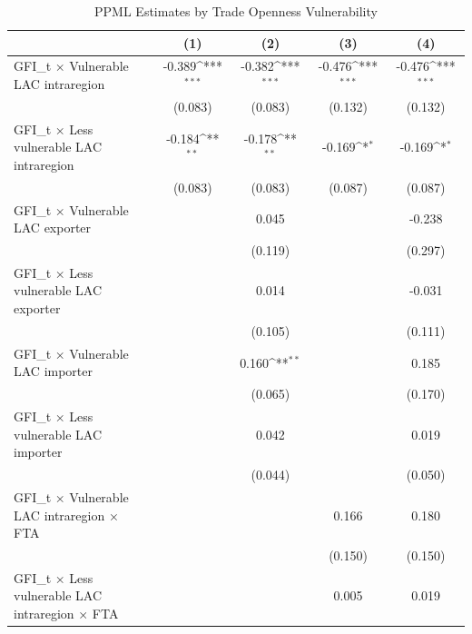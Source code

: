 \begin{table}[htbp]\centering
\def\sym#1{\ifmmode^{#1}\else\(^{#1}\)\fi}
\caption{PPML Estimates by Trade Openness Vulnerability}
\begin{tabular}{l*{4}{c}}
\hline\hline
          &\multicolumn{1}{c}{(1)}         &\multicolumn{1}{c}{(2)}         &\multicolumn{1}{c}{(3)}         &\multicolumn{1}{c}{(4)}         \\
\hline
GFI\_t × Vulnerable LAC intraregion&   -0.389\sym{***}&   -0.382\sym{***}&   -0.476\sym{***}&   -0.476\sym{***}\\
          &  (0.083)         &  (0.083)         &  (0.132)         &  (0.132)         \\
[1em]
GFI\_t × Less vulnerable LAC intraregion&   -0.184\sym{**} &   -0.178\sym{**} &   -0.169\sym{*}  &   -0.169\sym{*}  \\
          &  (0.083)         &  (0.083)         &  (0.087)         &  (0.087)         \\
[1em]
GFI\_t × Vulnerable LAC exporter&                  &    0.045         &                  &   -0.238         \\
          &                  &  (0.119)         &                  &  (0.297)         \\
[1em]
GFI\_t × Less vulnerable LAC exporter&                  &    0.014         &                  &   -0.031         \\
          &                  &  (0.105)         &                  &  (0.111)         \\
[1em]
GFI\_t × Vulnerable LAC importer&                  &    0.160\sym{**} &                  &    0.185         \\
          &                  &  (0.065)         &                  &  (0.170)         \\
[1em]
GFI\_t × Less vulnerable LAC importer&                  &    0.042         &                  &    0.019         \\
          &                  &  (0.044)         &                  &  (0.050)         \\
[1em]
GFI\_t × Vulnerable LAC intraregion × FTA&                  &                  &    0.166         &    0.180         \\
          &                  &                  &  (0.150)         &  (0.150)         \\
[1em]
GFI\_t × Less vulnerable LAC intraregion × FTA&                  &                  &    0.005         &    0.019         \\

\end{tabular}
\end{table}
